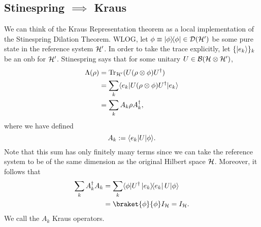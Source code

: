 \subsection*{Stinespring $\implies$ Kraus}
We can think of the Kraus Representation theorem as a local implementation of the Stinespring Dilation Theorem. WLOG, let $\phi\equiv \left\lvert \phi \middle\rangle\!\middle\langle \phi \right\rvert \in \mathcal{D}(\mathcal H')$ be some pure state in the reference system $\mathcal H'$. In order to take the trace explicitly, let $\{\lvert e_k\rangle\}_k$ be an onb for $\mathcal H'$. Stinespring says that for some unitary $U\in \mathcal{B}(\mathcal H \otimes \mathcal H')$,
\begin{align*}
    \Lambda(\rho)&= \operatorname{Tr}_{\mathcal H'}(U(\rho\otimes \phi) U^\dagger)\\
        &=\sum_k \langle e_k\rvert U(\rho\otimes \phi) U^\dagger \lvert e_k\rangle\\
        &=\sum_k A_k \rho A_k^\dagger,
\end{align*}
where we have defined
\begin{equation}
    A_k:= \langle e_k\rvert U \lvert\phi\rangle.
\end{equation}
Note that this sum has only finitely many terms since we can take the reference system to be of the same dimension as the original Hilbert space $\mathcal H$.
Moreover, it follows that
\begin{align*}
    \sum_k A_k^\dagger A_k &= \sum_k \bra{\phi}U^\dagger \kb{e_k}{e_k} U \ket{\phi}\\
    &= \braket{\phi}{\phi}I_{\cH} = I_{\cH}.
\end{align*}
We call the $A_k$ Kraus operators.%


